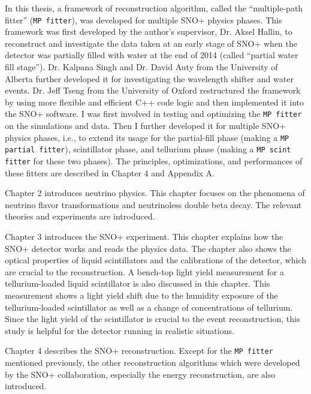 In this thesis, a framework of reconstruction algorithm, called the ``multiple-path fitter'' (\texttt{MP fitter}), was developed for multiple SNO+ physics phases. This framework was first developed by the author's supervisor, Dr. Aksel Hallin, to reconstruct and investigate the data taken at an early stage of SNO+ when the detector was partially filled with water at the end of 2014 (called ``partial water fill stage'')\cite{partialWater}. Dr. Kalpana Singh and Dr. David Auty from the University of Alberta further developed it for investigating the wavelength shifter and water events\cite{davidPartialWater, kalpanaWLS, kalpanaWLS2, kalpanaMPFitter}. Dr. Jeff Tseng from the University of Oxford restructured the framework by using more flexible and efficient C++ code logic and then implemented it into the SNO+ software\cite{jieMPW}.  I was first involved in testing and optimizing the \texttt{MP fitter} on the simulations and data. Then I further developed it for multiple SNO+ physics phases, i.e., to extend its usage for the partial-fill phase (making a \texttt{MP partial fitter}), scintillator phase, and tellurium phase (making a \texttt{MP scint fitter} for these two phases). The principles, optimizations, and performances of these fitters are described in Chapter 4 and Appendix A.

Chapter 2 introduces neutrino physics. This chapter focuses on the phenomena of neutrino flavor transformations and neutrinoless double beta decay. The relevant theories and experiments are introduced.

Chapter 3 introduces the SNO+ experiment. This chapter explains how the SNO+ detector works and reads the physics data. The chapter also shows the optical properties of liquid scintillators and the calibrations of the detector, which are crucial to the reconstruction. A bench-top light yield measurement for a tellurium-loaded liquid scintillator is also discussed in this chapter. This measurement shows a light yield shift due to the humidity exposure of the tellurium-loaded scintillator as well as a change of concentrations of tellurium. Since the light yield of the scintillator is crucial to the event reconstruction, this study is helpful for the detector running in realistic situations.

Chapter 4 describes the SNO+ reconstruction. Except for the \texttt{MP fitter} mentioned previously, the other reconstruction algorithms which were developed by the SNO+ collaboration, especially the energy reconstruction, are also introduced. 

